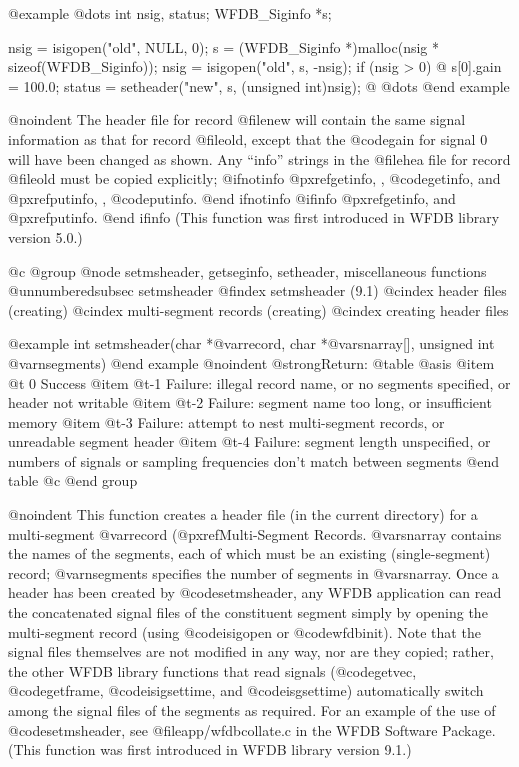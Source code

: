 {{{{{{{{@example
@dots{}
int nsig, status;
WFDB_Siginfo *s;

nsig = isigopen("old", NULL, 0);
s = (WFDB_Siginfo *)malloc(nsig * sizeof(WFDB_Siginfo));
nsig = isigopen("old", s, -nsig);
if (nsig > 0) @{
    s[0].gain = 100.0;
    status = setheader("new", s, (unsigned int)nsig);
@}
@dots{}
@end example

@noindent
The header file for record @file{new} will contain the same signal
information as that for record @file{old}, except that the @code{gain}
for signal 0 will have been changed as shown.  Any ``info'' strings in
the @file{hea} file for record @file{old} must be copied explicitly;
@ifnotinfo
@pxref{getinfo, , @code{getinfo}}, and @pxref{putinfo, , @code{putinfo}}.
@end ifnotinfo
@ifinfo
@pxref{getinfo}, and @pxref{putinfo}.
@end ifinfo
(This function was first
introduced in WFDB library version 5.0.)

@c @group
@node     setmsheader, getseginfo, setheader, miscellaneous functions
@unnumberedsubsec setmsheader
@findex setmsheader (9.1)
@cindex header files (creating)
@cindex multi-segment records (creating)
@cindex creating header files

@example
int setmsheader(char *@var{record}, char *@var{snarray}[], unsigned int @var{nsegments})
@end example
@noindent
@strong{Return:}
@table @asis
@item @t{ 0}
Success
@item @t{-1}
Failure: illegal record name, or no segments specified, or header not writable
@item @t{-2}
Failure: segment name too long, or insufficient memory
@item @t{-3}
Failure: attempt to nest multi-segment records, or unreadable segment
header
@item @t{-4}
Failure: segment length unspecified, or numbers of signals or sampling
frequencies don't match between segments
@end table
@c @end group

@noindent
This function creates a header file (in the current directory) for a
multi-segment @var{record} (@pxref{Multi-Segment Records}.  @var{snarray}
contains the names of the segments, each of which must be an existing
(single-segment) record; @var{nsegments} specifies the number of segments in
@var{snarray}.  Once a header has been created by @code{setmsheader}, any WFDB
application can read the concatenated signal files of the constituent segment
simply by opening the multi-segment record (using @code{isigopen} or
@code{wfdbinit}).  Note that the signal files themselves are not modified in
any way, nor are they copied; rather, the other WFDB library functions that
read signals (@code{getvec}, @code{getframe}, @code{isigsettime}, and
@code{isgsettime}) automatically switch among the signal files of the segments
as required.  For an example of the use of @code{setmsheader}, see
@file{app/wfdbcollate.c} in the WFDB Software Package.  (This function was
first introduced in WFDB library version 9.1.)

}}}}}}}}
